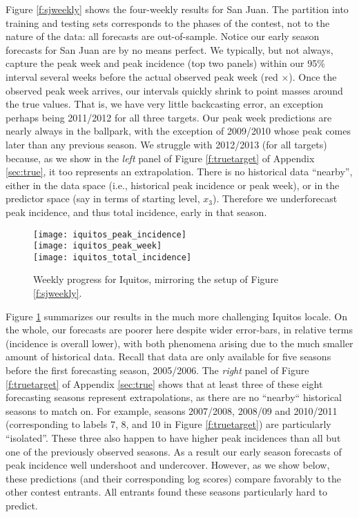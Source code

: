 \documentclass[12pt]{article}
\begin{document}
Figure \ref{f:sjweekly} shows the four-weekly results for San Juan.  The
partition into training and testing sets corresponds to the phases of the
contest, not to the nature of the data: all forecasts are out-of-sample.
Notice our early season forecasts for San Juan are by no means perfect. We
typically, but not always, capture the peak week and peak incidence (top two
panels) within our 95\% interval several weeks before the actual observed peak
week (red $\times$).  Once the observed peak week arrives, our intervals
quickly shrink to point masses around the true values. That is, we have very
little backcasting error, an exception perhaps being 2011/2012 for all three
targets.  Our peak week predictions are nearly always in the ballpark, with
the exception of 2009/2010 whose peak comes later than any previous season. We
struggle with 2012/2013 (for all targets) because, as we show in the {\em
left} panel of Figure \ref{f:truetarget} of Appendix \ref{sec:true}, it too
represents an extrapolation.  There is no historical data ``nearby'', either
in the data space (i.e., historical peak incidence or peak week), or in the
predictor space (say in terms of starting level, $x_3$).  Therefore we
underforecast peak incidence, and thus total incidence, early in that season.

\begin{figure}[ht!]
\centering
\vspace{-0.1cm}
\texttt{[image: iquitos\_peak\_incidence]}\\
\texttt{[image: iquitos\_peak\_week]}\\
\texttt{[image: iquitos\_total\_incidence]}
\vspace{-0.75cm}
\caption{Weekly progress for Iquitos, mirroring the setup of Figure \ref{f:sjweekly}.}
\label{f:iqweekly}
\end{figure}

Figure \ref{f:iqweekly} summarizes our results in the much more challenging
Iquitos locale.  On the whole, our forecasts are poorer here despite wider
error-bars, in relative terms (incidence is overall lower), with both
phenomena arising due to the much smaller amount of historical data. Recall
that data are only available for five seasons before the first forecasting
season, 2005/2006.  The {\em right} panel of Figure \ref{f:truetarget} of
Appendix \ref{sec:true} shows that at least three of these eight forecasting
seasons represent extrapolations, as there are no ``nearby`` historical
seasons to match on.  For example, seasons 2007/2008, 2008/09 and
2010/2011 (corresponding to labels 7, 8, and 10 in Figure \ref{f:truetarget})
are particularly ``isolated''. These three also happen to have higher peak
incidences than all but one of the previously observed seasons.  As a result
our early season forecasts of peak incidence well undershoot and undercover.
However, as we show below, these predictions (and their corresponding log
scores) compare favorably to the other contest entrants.  All entrants found
these seasons particularly hard to predict.
\end{document}
